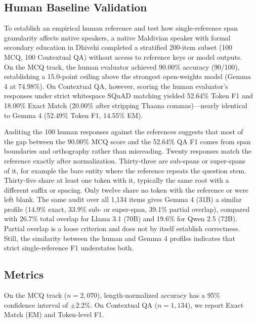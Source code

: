 \documentclass[acmsmall,review,anonymous]{acmart}
\begin{document}
\subsection{Human Baseline Validation}
\label{sec:human_baseline}
To establish an empirical human reference and test how single-reference span granularity affects native speakers, a native Maldivian speaker with formal secondary education in Dhivehi completed a stratified 200-item subset (100 MCQ, 100 Contextual QA) without access to reference keys or model outputs. On the MCQ track, the human evaluator achieved 90.00\% accuracy (90/100), establishing a 15.0-point ceiling above the strongest open-weights model (Gemma 4 at 74.98\%). On Contextual QA, however, scoring the human evaluator's responses under strict whitespace SQuAD matching yielded 52.64\% Token F1 and 18.00\% Exact Match (20.00\% after stripping Thaana commas)---nearly identical to Gemma 4 (52.49\% Token F1, 14.55\% EM).

Auditing the 100 human responses against the references suggests that most of the gap between the 90.00\% MCQ score and the 52.64\% QA F1 comes from span boundaries and orthography rather than misreading. Twenty responses match the reference exactly after normalization. Thirty-three are sub-spans or super-spans of it, for example the bare entity where the reference repeats the question stem. Thirty-five share at least one token with it, typically the same root with a different suffix or spacing. Only twelve share no token with the reference or were left blank. The same audit over all 1,134 items gives Gemma 4 (31B) a similar profile (14.9\% exact, 33.9\% sub- or super-span, 39.1\% partial overlap), compared with 26.7\% total overlap for Llama 3.1 (70B) and 19.6\% for Qwen 2.5 (72B). Partial overlap is a loose criterion and does not by itself establish correctness. Still, the similarity between the human and Gemma 4 profiles indicates that strict single-reference F1 understates both.

\subsection{Metrics}
On the MCQ track ($n=2,070$), length-normalized accuracy has a 95\% confidence interval of $\pm 2.2\%$. On Contextual QA ($n=1,134$), we report Exact Match (EM) and Token-level F1.
\end{document}
